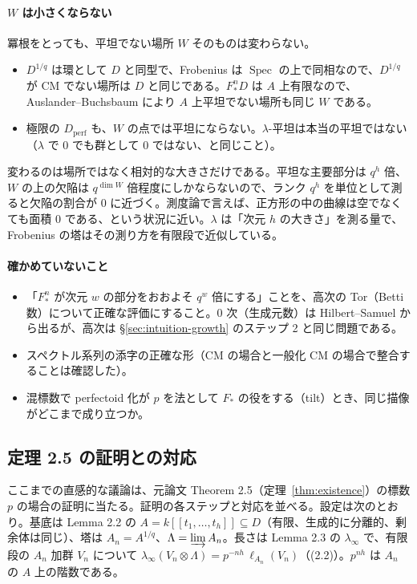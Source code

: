 \documentclass[11pt,a4paper]{ltjsarticle}
\numberwithin{equation}{section}
\theoremstyle{plain}
\theoremstyle{definition}
\theoremstyle{definition}
\begin{document}
\paragraph{$W$ は小さくならない}
冪根をとっても、平坦でない場所 $W$ そのものは変わらない。
\begin{itemize}
  \item $D^{1/q}$ は環として $D$ と同型で、Frobenius は $\operatorname{Spec}$ の上で同相なので、$D^{1/q}$ が CM でない場所は $D$ と同じである。$F^n_*D$ は $A$ 上有限なので、Auslander--Buchsbaum により $A$ 上平坦でない場所も同じ $W$ である。
  \item 極限の $D_{\mathrm{perf}}$ も、$W$ の点では平坦にならない。$\lambda$-平坦は本当の平坦ではない（$\lambda$ で $0$ でも群として $0$ ではない、と同じこと）。
\end{itemize}
変わるのは場所ではなく相対的な大きさだけである。平坦な主要部分は $q^h$ 倍、$W$ の上の欠陥は $q^{\dim W}$ 倍程度にしかならないので、ランク $q^h$ を単位として測ると欠陥の割合が $0$ に近づく。測度論で言えば、正方形の中の曲線は空でなくても面積 $0$ である、という状況に近い。$\lambda$ は「次元 $h$ の大きさ」を測る量で、Frobenius の塔はその測り方を有限段で近似している。

\paragraph{確かめていないこと}
\begin{itemize}
  \item 「$F^n_*$ が次元 $w$ の部分をおおよそ $q^w$ 倍にする」ことを、高次の Tor（Betti 数）について正確な評価にすること。$0$ 次（生成元数）は Hilbert--Samuel から出るが、高次は \S\ref{sec:intuition-growth} のステップ 2 と同じ問題である。
  \item スペクトル系列の添字の正確な形（CM の場合と一般化 CM の場合で整合することは確認した）。
  \item 混標数で perfectoid 化が $p$ を法として $F_*$ の役をする（tilt）とき、同じ描像がどこまで成り立つか。
\end{itemize}

\subsection{定理 2.5 の証明との対応}\label{sec:intuition-thm25}

ここまでの直感的な議論は、元論文 Theorem 2.5（定理~\ref{thm:existence}）の標数 $p$ の場合の証明に当たる。証明の各ステップと対応を並べる。設定は次のとおり。基底は Lemma 2.2 の $A = k[[t_1,\dots,t_h]]\subseteq D$（有限、生成的に分離的、剰余体は同じ）、塔は $A_n = A^{1/q}$、$\Lambda = \varinjlim A_n$。長さは Lemma 2.3 の $\lambda_\infty$ で、有限段の $A_n$ 加群 $V_n$ について $\lambda_\infty(V_n\otimes\Lambda) = p^{-nh}\,\ell_{A_n}(V_n)$（(2.2)）。$p^{nh}$ は $A_n$ の $A$ 上の階数である。
\end{document}
